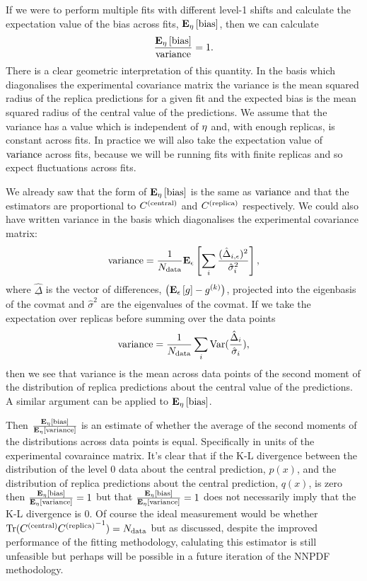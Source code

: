 If we were to perform multiple fits with different level-1
shifts and calculate the expectation value of the bias across fits,
$\mathbf{E}_{\eta}\left[ {\rm bias} \right]$, then we can calculate
\begin{equation}
    \label{eq:BiasVarRatio}
    \frac{\mathbf{E}_{\eta}\left[ {\rm bias} \right]}{{\rm variance}} = 1.
\end{equation}
There is a clear geometric interpretation of this quantity.
In the basis which diagonalises the experimental
covariance matrix the variance is the mean squared radius of the replica predictions for a
given fit and the expected bias is the mean squared radius of the central value
of the predictions. We assume that the variance has a value which is
independent of $\eta$ and, with enough replicas, is constant across fits.
In practice we will also take the expectation value of ${\rm variance}$ across fits,
because we will be running fits with finite replicas and so expect fluctuations
across fits.

We already saw that the form of $\mathbf{E}_{\eta}\left[ {\rm bias} \right]$ is the same as ${\rm variance}$ and that
the estimators are proportional to $C^{(\rm central)}$ and $C^{(\rm replica)}$ respectively.
We could also have written variance in the basis which diagonalises the
experimental covariance matrix:
\begin{equation}
    {\rm variance} = \frac{1}{N_{\rm data}} \mathbf{E}_{\epsilon}\left[  \sum_{i} \frac{(\hat{\Delta}_{i, \epsilon})^2}{\hat{\sigma}_{i}^2} \right],
\end{equation}
where $\underline{\hat{\Delta}}$ is the vector of differences, $\left( \mathbf{E}_{\epsilon}\left[ g \right] - g^{(k)}\right)$,
projected into the eigenbasis of the covmat and $\hat{\sigma}^2$ are the
eigenvalues of the covmat. If we take the expectation over replicas before
summing over the data points
\begin{equation}
    {\rm variance} = \frac{1}{N_{\rm data}} \sum_{i} {\rm Var}(\frac{\hat{\Delta}_i}{\hat{\sigma}_i}),
\end{equation}
then we see that variance is the mean across data points of the second moment
of the distribution of replica predictions about the central value of the predictions.
A similar argument can be applied to $\mathbf{E}_{\eta}\left[ {\rm bias} \right]$.

Then $\frac{\mathbf{E}_{\eta}\left[ {\rm bias} \right]}{\mathbf{E}_{\eta}\left[ {\rm variance} \right]}$ is an estimate of whether the average
of the second moments of the distributions across data points is equal. Specifically
in units of the experimental covaraince matrix. It's clear that if the K-L
divergence between the distribution of the level 0 data about the
central prediction, $p(x)$, and the distribution of replica predictions about the central
prediction, $q(x)$, is zero then $\frac{\mathbf{E}_{\eta}\left[ {\rm bias} \right]}{\mathbf{E}_{\eta}\left[ {\rm variance} \right]} = 1$
but that $\frac{\mathbf{E}_{\eta}\left[ {\rm bias} \right]}{\mathbf{E}_{\eta}\left[ {\rm variance} \right]} = 1$ does not necessarily
imply that the K-L divergence is 0. Of course the ideal measurement would be
whether ${\rm Tr} (C^{(\rm central)} {C^{(\rm replica)}}^{-1}) = N_{\rm data}$ but as discussed, despite
the improved performance of the fitting methodology, calulating this estimator
is still unfeasible but perhaps will be possible in a future iteration of the
NNPDF methodology.

